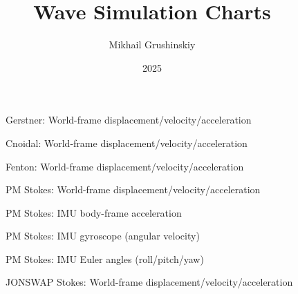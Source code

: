 \documentclass[11pt,letterpaper]{article}
\title{Wave Simulation Charts}
\author{Mikhail Grushinskiy}
\date{2025}
\begin{document}
\maketitle

\begin{figure}[H]\centering
  \resizebox{\textwidth}{!}{}
  \caption{Gerstner: World-frame displacement/velocity/acceleration}
  \label{fig:gerstner_world}
\end{figure}

\begin{figure}[H]\centering
  \resizebox{\textwidth}{!}{}
  \caption{Cnoidal: World-frame displacement/velocity/acceleration}
  \label{fig:cnoidal_world}
\end{figure}

\begin{figure}[H]\centering
  \resizebox{\textwidth}{!}{}
  \caption{Fenton: World-frame displacement/velocity/acceleration}
  \label{fig:fenton_world}
\end{figure}

\begin{figure}[H]\centering
  \resizebox{\textwidth}{!}{}
  \caption{PM Stokes: World-frame displacement/velocity/acceleration}
  \label{fig:pmstokes_world}
\end{figure}

\begin{figure}[H]\centering
  \resizebox{\textwidth}{!}{}
  \caption{PM Stokes: IMU body-frame acceleration}
  \label{fig:pmstokes_imu_acc}
\end{figure}

\begin{figure}[H]\centering
  \resizebox{\textwidth}{!}{}
  \caption{PM Stokes: IMU gyroscope (angular velocity)}
  \label{fig:pmstokes_imu_gyro}
\end{figure}

\begin{figure}[H]\centering
  \resizebox{\textwidth}{!}{}
  \caption{PM Stokes: IMU Euler angles (roll/pitch/yaw)}
  \label{fig:pmstokes_euler}
\end{figure}

\begin{figure}[H]\centering
  \resizebox{\textwidth}{!}{}
  \caption{JONSWAP Stokes: World-frame displacement/velocity/acceleration}
  \label{fig:jonswap_world}
\end{figure}
\end{document}
